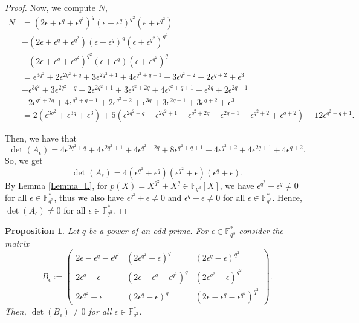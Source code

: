 \documentclass[12pt]{amsart}
\newtheorem{proposition}[theorem]{Proposition}
\def\e{\epsilon}
\newcommand{\F}{\mathbb{F}}
\def\e{\epsilon}
\begin{document}
\begin{proof}
	Now, we compute $N$,
	\begin{align*}
		N &= (2 \e + \e^q + \e^{q^2})^q (\e + \e^q)^{q^2} (\e + \e^{q^2})\\
		&+(2 \e + \e^q + \e^{q^2}) (\e + \e^q)^{q} (\e + \e^{q^2})^{q^2}\\
		&+(2 \e + \e^q + \e^{q^2})^{q^2} (\e + \e^q) (\e + \e^{q^2})^q\\
		&=\e^{3q^2} + 2 \e^{2q^2 + q} + 3 \e^{2q^2 + 1} + 4 \e^{q^2 + q + 1} + 3 \e^{q^2 + 2} + 2 \e^{q+2} + \e^3\\
		&+\e^{3q^2} + 3\e^{2q^2 + q} + 2 \e^{2q^2 + 1} + 3 \e^{q^2 + 2q} + 4 \e^{q^2 + q + 1} + \e^{3q} + 2 \e^{2q+1}\\
		&+2 \e^{q^2 + 2q} + 4 \e^{q^2 + q + 1} + 2 \e^{q^2 + 2} + \e^{3q} + 3 \e^{2q+1} + 3 \e^{q+2} + \e^3\\
		&= 2(\e^{3q^2} + \e^{3q} + \e^3) + 5(\e^{2q^2+q} + \e^{2q^2+1} + \e^{q^2+2q} + \e^{2q+1} + \e^{q^2+2} + \e^{q+2}) + 12\e^{q^2+q+1}.
	\end{align*}
	
	
	Then, we have that 
	$$
	\det(A_{\e}) = 4 \e^{2q^2 + q} + 4 \e^{2q^2 + 1} + 4 \e^{q^2 + 2q} + 8 \e^{q^2 + q + 1} + 4 \e^{q^2 + 2} + 4 \e^{2q+1} + 4 \e^{q+2}.
	$$
	So, we get 
	\[
	\det(A_{\e}) = 4 (\e^{q^2}+\e^q)(\e^{q^2}+\e)(\e^q+\e).
	\]
	By Lemma \ref{Lemma_L}, for $p(X)=X^{q^2}+X^q \in \F_{q^3}[X]$, we have $\e^{q^2}+\e^q \neq 0$ for all $\e \in \F_{q^3}^\ast$, thus we also have  $\e^{q^2}+\e \neq 0$ and $\e^{q}+\e \neq 0$ for all $\e \in \F_{q^3}^\ast$. Hence, $\det(A_\e) \neq 0$ for all $\e \in \mathbb{F}_{q^3}^{\ast}$.
\end{proof}


\begin{proposition} \label{lemma Bh}
	Let $q$ be a power of an odd prime. For $\e \in \mathbb{F}_{q^3}^{\ast}$ consider the matrix
	$$
	B_{\e}:=\left( \begin{array}{ccc}
		2 \epsilon - \epsilon^q - \epsilon^{q^2} & ( 2\epsilon^{q^2} - \epsilon)^q & (2\epsilon^q -\epsilon)^{q^2}\\
		2\epsilon^q -\epsilon & (2 \epsilon - \epsilon^q - \epsilon^{q^2})^q & ( 2\epsilon^{q^2} - \epsilon )^{q^2}\\
		2\epsilon^{q^2} - \epsilon & (2\epsilon^q -\epsilon)^q & (2 \epsilon - \epsilon^q - \epsilon^{q^2})^{q^2}
	\end{array}\right).
	$$
	Then, $\det(B_{\e}) \neq 0$ for all $\e \in \mathbb{F}_{q^3}^{\ast}$. 
\end{proposition}
\end{document}

